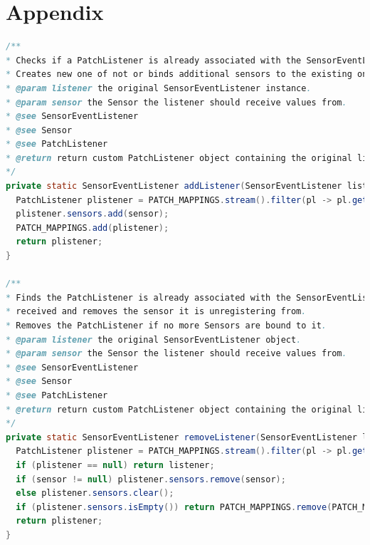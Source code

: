 \documentclass[11pt,
  oneside,openany,    %
]{scrreprt}
\begin{document}

\printbibliography[heading=bibintoc]

\appendix

\chapter{Appendix}
\label{chap:appendix}


\begin{lstlisting}[language=java, caption=Interception Helper Methods, label=lst:intercept_help_method]
/**
* Checks if a PatchListener is already associated with the SensorEventListener received.
* Creates new one of not or binds additional sensors to the existing ones.
* @param listener the original SensorEventListener instance.
* @param sensor the Sensor the listener should receive values from.
* @see SensorEventListener
* @see Sensor
* @see PatchListener
* @return return custom PatchListener object containing the original listener.
*/
private static SensorEventListener addListener(SensorEventListener listener, Sensor sensor) {
  PatchListener plistener = PATCH_MAPPINGS.stream().filter(pl -> pl.getListener().equals(listener)).findAny().orElse(new PatchListener(listener));
  plistener.sensors.add(sensor);
  PATCH_MAPPINGS.add(plistener);
  return plistener;
}

/**
* Finds the PatchListener is already associated with the SensorEventListener
* received and removes the sensor it is unregistering from.
* Removes the PatchListener if no more Sensors are bound to it.
* @param listener the original SensorEventListener object.
* @param sensor the Sensor the listener should receive values from.
* @see SensorEventListener
* @see Sensor
* @see PatchListener
* @return return custom PatchListener object containing the original listener. If none found it returns the original listener
*/
private static SensorEventListener removeListener(SensorEventListener listener, Sensor sensor) {
  PatchListener plistener = PATCH_MAPPINGS.stream().filter(pl -> pl.getListener().equals(listener)).findAny().orElse(null);
  if (plistener == null) return listener;
  if (sensor != null) plistener.sensors.remove(sensor);
  else plistener.sensors.clear();
  if (plistener.sensors.isEmpty()) return PATCH_MAPPINGS.remove(PATCH_MAPPINGS.indexOf(plistener));
  return plistener;
}
\end{lstlisting}
\end{document}
